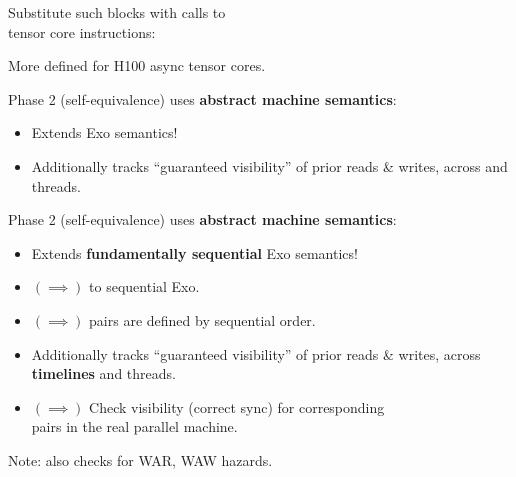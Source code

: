 \newpage
{}

{\LARGE
Substitute such blocks with calls to\\
 tensor core instructions:

}

{\LARGE

}

{\LARGE
More  defined for H100 async tensor cores.

}


\newpage
{}

{\LARGE
Phase 2 (self-equivalence) uses \textbf{abstract machine semantics}:
\begin{itemize}
  \item Extends  Exo semantics!
  \item Additionally tracks ``guaranteed visibility'' of prior reads \& writes, across  and threads.
\end{itemize}

}

\begin{center}
{\large
{}
}
\end{center}


\newpage
{}

{\LARGE
Phase 2 (self-equivalence) uses \textbf{abstract machine semantics}:
\begin{itemize}
  \item {\color{lightgray} Extends \textbf{fundamentally sequential} Exo semantics!}
  \item $(\implies)$  to sequential Exo.
  \item $(\implies)$  pairs are defined by sequential order.
  \item {\color{lightgray} Additionally tracks ``guaranteed visibility'' of prior reads \& writes, across \textbf{timelines} and threads.}
  \item $(\implies)$ Check visibility (correct sync) for corresponding\\ pairs in the real parallel machine.
\end{itemize}

\vfill

\hfill Note: also checks for WAR, WAW hazards.

}


